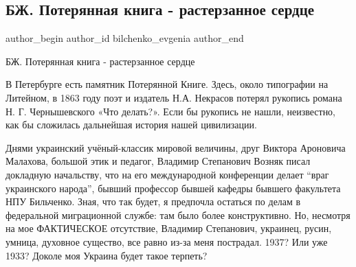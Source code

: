  
 
 
 
 
 
\subsection{БЖ. Потерянная книга - растерзанное сердце}
\label{sec:12_02_2022.tg.bilchenko_evgenia.2.poterjannaja_kniga}
 
\ifcmt
 author_begin
   author_id bilchenko_evgenia
 author_end
\fi

БЖ. Потерянная книга - растерзанное сердце

В Петербурге есть памятник Потерянной Книге. Здесь, около типографии на
Литейном, в 1863 году поэт и издатель Н.А. Некрасов потерял рукопись романа
Н. Г. Чернышевского «Что делать?». Если бы рукопись не нашли, неизвестно, как бы
сложилась дальнейшая история нашей цивилизации.


Днями украинский учёный-классик мировой величины, друг Виктора Ароновича
Малахова, большой этик и педагог, Владимир Степанович Возняк писал докладную
начальству, что на его международной конференции делает \enquote{враг украинского
народа}, бывший профессор бывшей кафедры бывшего факультета НПУ Бильченко.
Зная, что так будет, я предпочла остаться по делам в федеральной миграционной
службе: там было более конструктивно. Но, несмотря на мое ФАКТИЧЕСКОЕ
отсутствие, Владимир Степанович, украинец, русин, умница, духовное существо,
все равно из-за меня пострадал. 1937? Или уже 1933? Доколе моя Украина будет
такое терпеть?

